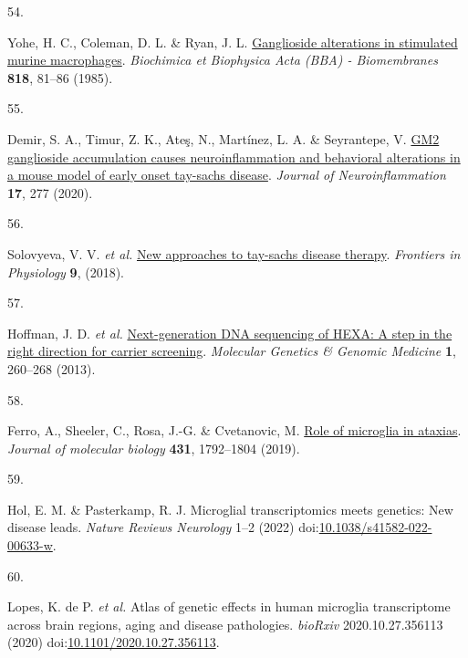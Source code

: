 \documentclass[
]{article}
\newlength{\cslhangindent}
\newlength{\csllabelwidth}
\newenvironment{CSLReferences}[2] %
 {\begin{list}{}{%
  \setlength{\itemindent}{0pt}
  \setlength{\leftmargin}{0pt}
  \setlength{\parsep}{0pt}
  \ifodd #1
   \setlength{\leftmargin}{\cslhangindent}
   \setlength{\itemindent}{-1\cslhangindent}
  \fi
  \setlength{\itemsep}{#2\baselineskip}}}
 {\end{list}}
\newcommand{\CSLLeftMargin}[1]{\parbox[t]{\csllabelwidth}{\strut#1\strut}}
\newcommand{\CSLRightInline}[1]{\parbox[t]{\linewidth - \csllabelwidth}{\strut#1\strut}}
\begin{document}
\begin{CSLReferences}{0}{0}
\CSLLeftMargin{54. }%
\CSLRightInline{Yohe, H. C., Coleman, D. L. \& Ryan, J. L.
\href{https://doi.org/10.1016/0005-2736(85)90141-5}{Ganglioside
alterations in stimulated murine macrophages}. \emph{Biochimica et
Biophysica Acta (BBA) - Biomembranes} \textbf{818}, 81--86 (1985).}

\CSLLeftMargin{55. }%
\CSLRightInline{Demir, S. A., Timur, Z. K., Ateş, N., Martínez, L. A. \&
Seyrantepe, V. \href{https://doi.org/10.1186/s12974-020-01947-6}{GM2
ganglioside accumulation causes neuroinflammation and behavioral
alterations in a mouse model of early onset tay-sachs disease}.
\emph{Journal of Neuroinflammation} \textbf{17}, 277 (2020).}

\CSLLeftMargin{56. }%
\CSLRightInline{Solovyeva, V. V. \emph{et al.}
\href{https://doi.org/10.3389/fphys.2018.01663}{New approaches to
tay-sachs disease therapy}. \emph{Frontiers in Physiology} \textbf{9},
(2018).}

\CSLLeftMargin{57. }%
\CSLRightInline{Hoffman, J. D. \emph{et al.}
\href{https://doi.org/10.1002/mgg3.37}{Next-generation DNA sequencing of
HEXA: A step in the right direction for carrier screening}.
\emph{Molecular Genetics \& Genomic Medicine} \textbf{1}, 260--268
(2013).}

\CSLLeftMargin{58. }%
\CSLRightInline{Ferro, A., Sheeler, C., Rosa, J.-G. \& Cvetanovic, M.
\href{https://doi.org/10.1016/j.jmb.2019.01.016}{Role of microglia in
ataxias}. \emph{Journal of molecular biology} \textbf{431}, 1792--1804
(2019).}

\CSLLeftMargin{59. }%
\CSLRightInline{Hol, E. M. \& Pasterkamp, R. J. Microglial
transcriptomics meets genetics: New disease leads. \emph{Nature Reviews
Neurology} 1--2 (2022)
doi:\href{https://doi.org/10.1038/s41582-022-00633-w}{10.1038/s41582-022-00633-w}.}

\CSLLeftMargin{60. }%
\CSLRightInline{Lopes, K. de P. \emph{et al.} Atlas of genetic effects
in human microglia transcriptome across brain regions, aging and disease
pathologies. \emph{bioRxiv} 2020.10.27.356113 (2020)
doi:\href{https://doi.org/10.1101/2020.10.27.356113}{10.1101/2020.10.27.356113}.}


\end{CSLReferences}
\end{document}
